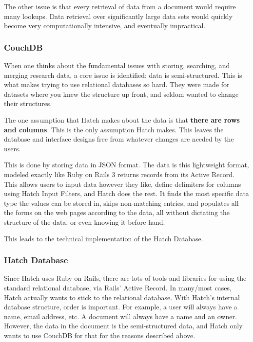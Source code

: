 The other issue is that every retrieval of data from a document would require
many lookups. Data retrieval over significantly large data sets would quickly become
very computationally intensive, and eventually  impractical.


\subsubsection{CouchDB}
When one thinks about the fundamental issues with storing, searching, and merging 
research data, a core issue is identified: data is semi-structured. This is what
makes trying to use relational databases so hard. They were made for datasets where
you knew the structure up front, and seldom wanted to change their structures.

The one assumption that Hatch makes about the data is that \textbf{there are rows and
columns}. This is the only assumption Hatch makes. This leaves the database and 
interface designs free from whatever changes are needed by the users.

This is done by storing data in JSON format. The data is this lightweight format,
modeled exactly like Ruby on Rails 3 returns records from its Active Record.
This allows users to input data however they like, define delimiters for columns using
Hatch Input Filters, and Hatch does the rest. It finds the most specific data type the
values can be stored in, skips non-matching entries, and populates all the forms on 
the web pages according to the data, all without dictating the structure of the 
data, or even knowing it before hand.

This leads to the technical implementation of the Hatch Database.


\subsubsection{Hatch Database}
Since Hatch uses Ruby on Rails, there are lots of tools and libraries for using the 
standard relational database, via Rails' Active Record. In many/most cases, Hatch
actually wants to stick to the relational database. With Hatch's internal database
structure, order is important. For example, a user will always have a name, email
address, etc. A document will always have a name and an owner. However, the data in the
document is the semi-structured data, and Hatch only wants to use CouchDB for that for
the reasons described above.

